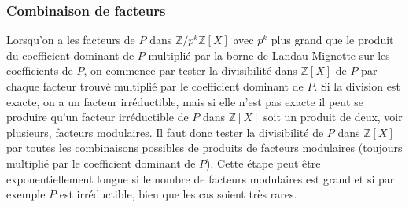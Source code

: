 \documentclass[a4paper,11pt]{article}
\newcommand{\Z}{{\mathbb{Z}}}
\begin{document}
\begin{giacjshere}
\subsubsection{Combinaison de facteurs}
Lorsqu'on a les facteurs de $P$ dans $\Z/p^k\Z[X]$ avec $p^k$ plus grand
que le produit du coefficient dominant de $P$ multiplié par la borne
de Landau-Mignotte sur les coefficients de $P$, on commence par
tester la divisibilité dans $\Z[X]$ de $P$ par chaque facteur trouvé
multiplié par le coefficient dominant de $P$. Si la division est
exacte, on a un facteur irréductible, mais si elle n'est pas exacte
il peut se produire qu'un facteur irréductible de $P$ dans $\Z[X]$ soit un
produit de deux, voir plusieurs, facteurs modulaires. Il faut
donc tester la divisibilité de $P$ dans $\Z[X]$ par toutes les combinaisons 
possibles de produits de facteurs modulaires (toujours multiplié par
le coefficient dominant de $P$). Cette étape peut être exponentiellement
longue si le nombre de facteurs modulaires est grand et si par
exemple $P$ est irréductible, bien que les cas soient très rares. 


\end{giacjshere}
\end{document}
